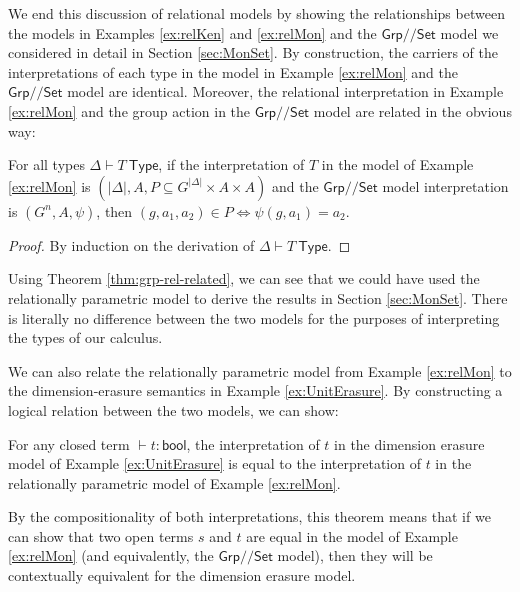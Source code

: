 \documentclass[a4paper,UKenglish]{lipics}
\newcommand{\msf}[1]{\mathsf{#1}} %
\newcommand{\Grp}{\msf{Grp}}
\newcommand{\Set}{\msf{Set}}
\newcommand{\Lslice}[1]{#1/\!/\Set}
\newcommand{\GrpSet}{\Lslice{\Grp}}
\begin{document}
We end this discussion of relational models by showing the
relationships between the models in Examples \ref{ex:relKen} and
\ref{ex:relMon} and the $\GrpSet$ model we considered in detail in
Section \ref{sec:MonSet}. By construction, the carriers of the
interpretations of each type in the model in Example \ref{ex:relMon}
and the $\GrpSet$ model are identical. Moreover, the relational
interpretation in Example \ref{ex:relMon} and the group action in the
$\GrpSet$ model are related in the obvious way:
\begin{theorem}\label{thm:grp-rel-related}
  For all types $\Delta \vdash T~\msf{Type}$, if the interpretation of
  $T$ in the model of Example \ref{ex:relMon} is $(|\Delta|, A, P
  \subseteq G^{|\Delta|} \times A \times A)$ and the $\GrpSet$ model
  interpretation is $(G^n, A, \psi)$, then $(g, a_1, a_2) \in P
  \Leftrightarrow \psi(g,a_1) = a_2$.
\end{theorem}
\begin{proof}
  By induction on the derivation of $\Delta \vdash T~\msf{Type}$.
\end{proof}

Using Theorem \ref{thm:grp-rel-related}, we can see that we could have
used the relationally parametric model to derive the results in
Section \ref{sec:MonSet}. There is literally no difference between the
two models for the purposes of interpreting the types of our calculus.

We can also relate the relationally parametric model from Example
\ref{ex:relMon} to the dimension-erasure semantics in Example
\ref{ex:UnitErasure}. By constructing a logical relation between the
two models, we can show:
\begin{theorem}\label{thm:closed-prog-equiv}
  For any closed term $\vdash t : \msf{bool}$, the interpretation of
  $t$ in the dimension erasure model of Example \ref{ex:UnitErasure}
  is equal to the interpretation of $t$ in the relationally parametric
  model of Example \ref{ex:relMon}.
\end{theorem}

\noindent
By the compositionality of both interpretations, this theorem means
that if we can show that two open terms $s$ and $t$ are equal in the
model of Example \ref{ex:relMon} (and equivalently, the $\GrpSet$
model), then they will be contextually equivalent for the dimension
erasure model.
\end{document}
